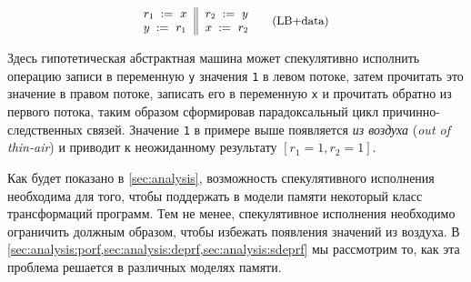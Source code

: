 \begin{equation*}
\small
\inarrII{
  \readInst{}{r_1}{x}   \\
  \writeInst{}{y}{r_1}  \\
}{
  \readInst{}{r_2}{y}   \\
  \writeInst{}{x}{r_2}  \\
}
\tag{LB+data}\label{ex:lb+data}
\end{equation*}

Здесь гипотетическая абстрактная машина 
может спекулятивно исполнить операцию записи в переменную \texttt{y}
значения \texttt{1} в левом потоке, 
затем прочитать это значение в правом потоке, 
записать его в переменную \texttt{x} и прочитать обратно из 
первого потока, таким образом сформировав парадоксальный цикл 
причинно-следственных связей.  
Значение \texttt{1} в примере выше появляется \emph{из воздуха}
(\emph{out of thin-air}) и приводит 
к неожиданному результату ${[r_1=1, r_2=1]}$.

Как будет показано в \cref{sec:analysis},
возможность спекулятивного исполнения необходима для того, чтобы 
поддержать в модели памяти некоторый класс трансформаций программ. 
Тем не менее, спекулятивное исполнения необходимо 
ограничить должным образом, чтобы избежать 
появления значений из воздуха. 
В \cref{sec:analysis:porf,sec:analysis:deprf,sec:analysis:sdeprf}
мы рассмотрим то, как эта проблема решается в различных моделях памяти. 
